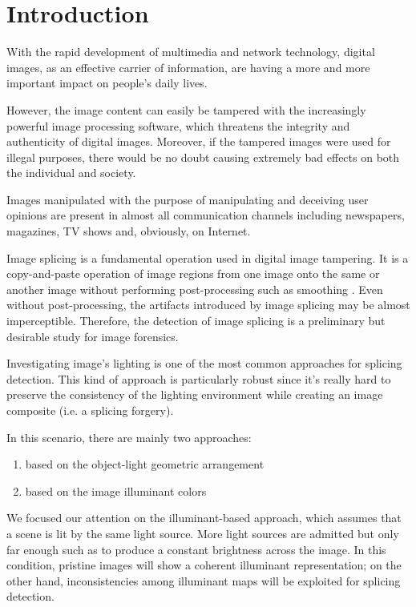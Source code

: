 \chapter*{Introduction}

With the rapid development of multimedia and network technology, digital images, as an effective carrier of information, are having a more and more important impact on people's daily lives. 

However, the image content can easily be tampered with the increasingly powerful image processing software, which threatens the integrity and authenticity of digital images. Moreover, if the tampered images were used for illegal purposes, there would be no doubt causing extremely bad effects on both the individual and society.

Images manipulated with the purpose of manipulating and deceiving user opinions are present in almost all communication channels including newspapers, magazines, TV shows and, obviously, on Internet.\cite{rocha2011vision}

Image splicing is a fundamental operation used in digital image tampering. It is a copy-and-paste
operation of image regions from one image onto the same or another image without performing post-processing such as smoothing \cite{ng2004blind}. Even without post-processing, the artifacts introduced by
image splicing may be almost imperceptible. Therefore, the detection of image splicing is a preliminary but desirable study for image forensics.

Investigating image's lighting is one of the most common approaches for splicing detection. This kind of approach is particularly robust since it's really hard to preserve the consistency of the lighting environment while creating an image composite (i.e. a splicing forgery). 

In this scenario, there are mainly two approaches:
\begin{enumerate}
\item based on the object-light geometric arrangement
\item based on the image illuminant colors
\end{enumerate}

We focused our attention on the illuminant-based approach, which assumes that a scene is lit by the same light source. More light sources are admitted but only far enough such as to produce a constant brightness across the image. In this condition, pristine images will show a coherent illuminant representation; on the other hand, inconsistencies among illuminant maps will be exploited for splicing detection. 

